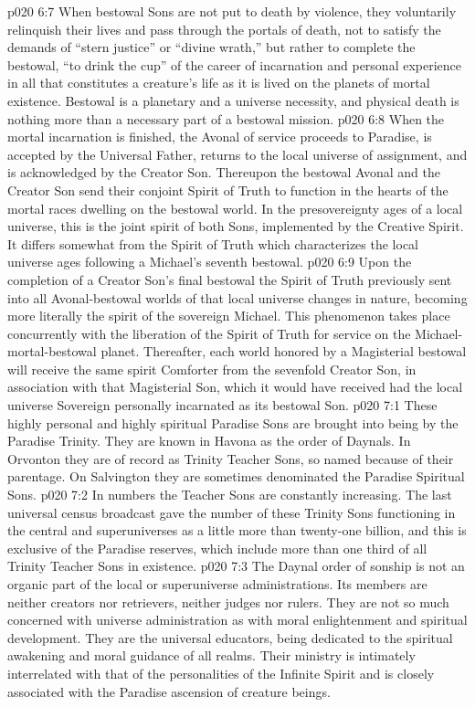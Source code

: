 \vs p020 6:7 When bestowal Sons are not put to death by violence, they voluntarily relinquish their lives and pass through the portals of death, not to satisfy the demands of “stern justice” or “divine wrath,” but rather to complete the bestowal, “to drink the cup” of the career of incarnation and personal experience in all that constitutes a creature’s life as it is lived on the planets of mortal existence. Bestowal is a planetary and a universe necessity, and physical death is nothing more than a necessary part of a bestowal mission.
\vs p020 6:8 When the mortal incarnation is finished, the Avonal of service proceeds to Paradise, is accepted by the Universal Father, returns to the local universe of assignment, and is acknowledged by the Creator Son. Thereupon the bestowal Avonal and the Creator Son send their conjoint Spirit of Truth to function in the hearts of the mortal races dwelling on the bestowal world. In the presovereignty ages of a local universe, this is the joint spirit of both Sons, implemented by the Creative Spirit. It differs somewhat from the Spirit of Truth which characterizes the local universe ages following a Michael’s seventh bestowal.
\vs p020 6:9 Upon the completion of a Creator Son’s final bestowal the Spirit of Truth previously sent into all Avonal\hyp{}bestowal worlds of that local universe changes in nature, becoming more literally the spirit of the sovereign Michael. This phenomenon takes place concurrently with the liberation of the Spirit of Truth for service on the Michael\hyp{}mortal\hyp{}bestowal planet. Thereafter, each world honored by a Magisterial bestowal will receive the same spirit Comforter from the sevenfold Creator Son, in association with that Magisterial Son, which it would have received had the local universe Sovereign personally incarnated as its bestowal Son.
\vs p020 7:1 These highly personal and highly spiritual Paradise Sons are brought into being by the Paradise Trinity. They are known in Havona as the order of Daynals. In Orvonton they are of record as Trinity Teacher Sons, so named because of their parentage. On Salvington they are sometimes denominated the Paradise Spiritual Sons.
\vs p020 7:2 In numbers the Teacher Sons are constantly increasing. The last universal census broadcast gave the number of these Trinity Sons functioning in the central and superuniverses as a little more than twenty\hyp{}one billion, and this is exclusive of the Paradise reserves, which include more than one third of all Trinity Teacher Sons in existence.
\vs p020 7:3 The Daynal order of sonship is not an organic part of the local or superuniverse administrations. Its members are neither creators nor retrievers, neither judges nor rulers. They are not so much concerned with universe administration as with moral enlightenment and spiritual development. They are the universal educators, being dedicated to the spiritual awakening and moral guidance of all realms. Their ministry is intimately interrelated with that of the personalities of the Infinite Spirit and is closely associated with the Paradise ascension of creature beings.
